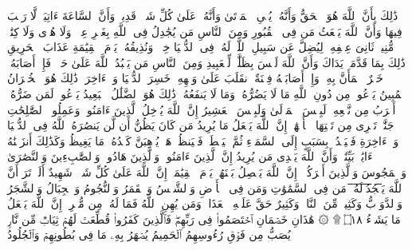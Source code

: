 \startbuffer[\q:22:6]
ذَٰلِكَ بِأَنَّ ٱللَّهَ هُوَ ٱلۡحَقُّ وَأَنَّهُۥ یُحۡیِ ٱلۡمَوۡتَىٰ وَأَنَّهُۥ عَلَىٰ كُلِّ شَیۡءࣲ قَدِیرࣱ%
\stopbuffer%
\startbuffer[\q:22:7]
وَأَنَّ ٱلسَّاعَةَ ءَاتِیَةࣱ لَّا رَیۡبَ فِیهَا وَأَنَّ ٱللَّهَ یَبۡعَثُ مَن فِی ٱلۡقُبُورِ%
\stopbuffer%
\startbuffer[\q:22:8]
وَمِنَ ٱلنَّاسِ مَن یُجَٰدِلُ فِی ٱللَّهِ بِغَیۡرِ عِلۡمࣲ وَلَا هُدࣰى وَلَا كِتَٰبࣲ مُّنِیرࣲ%
\stopbuffer%
\startbuffer[\q:22:9]
ثَانِیَ عِطۡفِهِۦ لِیُضِلَّ عَن سَبِیلِ ٱللَّهِۖ لَهُۥ فِی ٱلدُّنۡیَا خِزۡیࣱۖ وَنُذِیقُهُۥ یَوۡمَ ٱلۡقِیَٰمَةِ عَذَابَ ٱلۡحَرِیقِ%
\stopbuffer%
\startbuffer[\q:22:10]
ذَٰلِكَ بِمَا قَدَّمَتۡ یَدَاكَ وَأَنَّ ٱللَّهَ لَیۡسَ بِظَلَّٰمࣲ لِّلۡعَبِیدِ%
\stopbuffer%
\startbuffer[\q:22:11]
وَمِنَ ٱلنَّاسِ مَن یَعۡبُدُ ٱللَّهَ عَلَىٰ حَرۡفࣲۖ فَإِنۡ أَصَابَهُۥ خَیۡرٌ ٱطۡمَأَنَّ بِهِۦۖ وَإِنۡ أَصَابَتۡهُ فِتۡنَةٌ ٱنقَلَبَ عَلَىٰ وَجۡهِهِۦ خَسِرَ ٱلدُّنۡیَا وَٱلۡءَاخِرَةَۚ ذَٰلِكَ هُوَ ٱلۡخُسۡرَانُ ٱلۡمُبِینُ%
\stopbuffer%
\startbuffer[\q:22:12]
یَدۡعُوا۟ مِن دُونِ ٱللَّهِ مَا لَا یَضُرُّهُۥ وَمَا لَا یَنفَعُهُۥۚ ذَٰلِكَ هُوَ ٱلضَّلَٰلُ ٱلۡبَعِیدُ%
\stopbuffer%
\startbuffer[\q:22:13]
یَدۡعُوا۟ لَمَن ضَرُّهُۥۤ أَقۡرَبُ مِن نَّفۡعِهِۦۚ لَبِئۡسَ ٱلۡمَوۡلَىٰ وَلَبِئۡسَ ٱلۡعَشِیرُ%
\stopbuffer%
\startbuffer[\q:22:14]
إِنَّ ٱللَّهَ یُدۡخِلُ ٱلَّذِینَ ءَامَنُوا۟ وَعَمِلُوا۟ ٱلصَّٰلِحَٰتِ جَنَّٰتࣲ تَجۡرِی مِن تَحۡتِهَا ٱلۡأَنۡهَٰرُۚ إِنَّ ٱللَّهَ یَفۡعَلُ مَا یُرِیدُ%
\stopbuffer%
\startbuffer[\q:22:15]
مَن كَانَ یَظُنُّ أَن لَّن یَنصُرَهُ ٱللَّهُ فِی ٱلدُّنۡیَا وَٱلۡءَاخِرَةِ فَلۡیَمۡدُدۡ بِسَبَبٍ إِلَى ٱلسَّمَاۤءِ ثُمَّ لۡیَقۡطَعۡ فَلۡیَنظُرۡ هَلۡ یُذۡهِبَنَّ كَیۡدُهُۥ مَا یَغِیظُ%
\stopbuffer%
\startbuffer[\q:22:16]
وَكَذَٰلِكَ أَنزَلۡنَٰهُ ءَایَٰتِۭ بَیِّنَٰتࣲ وَأَنَّ ٱللَّهَ یَهۡدِی مَن یُرِیدُ%
\stopbuffer%
\startbuffer[\q:22:17]
إِنَّ ٱلَّذِینَ ءَامَنُوا۟ وَٱلَّذِینَ هَادُوا۟ وَٱلصَّٰبِءِینَ وَٱلنَّصَٰرَىٰ وَٱلۡمَجُوسَ وَٱلَّذِینَ أَشۡرَكُوۤا۟ إِنَّ ٱللَّهَ یَفۡصِلُ بَیۡنَهُمۡ یَوۡمَ ٱلۡقِیَٰمَةِۚ إِنَّ ٱللَّهَ عَلَىٰ كُلِّ شَیۡءࣲ شَهِیدٌ%
\stopbuffer%
\startbuffer[\q:22:18]
أَلَمۡ تَرَ أَنَّ ٱللَّهَ یَ̅سۡ̅جُ̅دُ̅ ̅لَ̅هُ̅ۥ̅ مَن فِی ٱلسَّمَٰوَٰتِ وَمَن فِی ٱلۡأَرۡضِ وَٱلشَّمۡسُ وَٱلۡقَمَرُ وَٱلنُّجُومُ وَٱلۡجِبَالُ وَٱلشَّجَرُ وَٱلدَّوَاۤبُّ وَكَثِیرࣱ مِّنَ ٱلنَّاسِۖ وَكَثِیرٌ حَقَّ عَلَیۡهِ ٱلۡعَذَابُۗ وَمَن یُهِنِ ٱللَّهُ فَمَا لَهُۥ مِن مُّكۡرِمٍۚ إِنَّ ٱللَّهَ یَفۡعَلُ مَا یَشَاۤءُ ۝١٨ ۩%
\stopbuffer%
\startbuffer[\q:22:19]
۞ هَٰذَانِ خَصۡمَانِ ٱخۡتَصَمُوا۟ فِی رَبِّهِمۡۖ فَٱلَّذِینَ كَفَرُوا۟ قُطِّعَتۡ لَهُمۡ ثِیَابࣱ مِّن نَّارࣲ یُصَبُّ مِن فَوۡقِ رُءُوسِهِمُ ٱلۡحَمِیمُ%
\stopbuffer%
\startbuffer[\q:22:20]
یُصۡهَرُ بِهِۦ مَا فِی بُطُونِهِمۡ وَٱلۡجُلُودُ%
